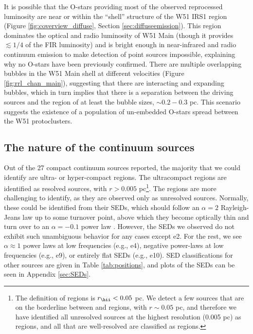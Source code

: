 It is possible that the O-stars providing most of the observed reprocessed
luminosity are near or within the ``shell'' structure of the W51 IRS1 region
(Figure \ref{fig:coverview_diffuse}, Section \ref{sec:diffuseemission}).  This
region dominates the optical and radio luminosity of W51 Main (though it
provides $\lesssim 1/4$ of the FIR luminosity) and is bright enough in
near-infrared and radio continuum emission to make detection of point sources
impossible, explaining why no O-stars have been previously confirmed.  There
are multiple overlapping \hii bubbles in the W51 Main shell at different
velocities (Figure \ref{fig:rrl_chan_main}), suggesting that there are
interacting and  expanding bubbles, which in turn implies that there is a
separation between the driving sources and the \hii region of at least the
bubble sizes, $\sim0.2-0.3$ pc.  This scenario suggests the existence of a
population of un-embedded O-stars spread between the W51 protoclusters.

\subsection{The nature of the continuum sources}
\label{sec:contnature}

Out of the 27 compact continuum sources reported, the majority that we could
identify are ultra- or hyper-compact \hii regions.  The ultracompact \hii
regions are identified as resolved sources, with $r>0.005$
pc\footnote{The
\citet{Kurtz2002a} definition of \hchii regions is $r_{\hii}<0.05$ pc.  We
detect a few sources that are on the borderline between \hchii
and \uchii regions, with $r\sim0.05$ pc, and therefore we have identified all
unresolved sources at the highest resolution (0.005 pc) as \hchii regions, and
all that are well-resolved are classified as \uchii regions.}.  The \hchii
regions are more
challenging to identify, as they are observed only as unresolved sources.
Normally, these could be identified from their SEDs, which should follow an
$\alpha=2$ Rayleigh-Jeans law up to some turnover point, above which they 
become optically thin and turn over to an $\alpha={-0.1}$ power law
\citep{Wilson2009a}.  However, the SEDs we observed do not exhibit such unambiguous
behavior for any cases except e2.  For the rest, we see $\alpha\approx1$ power laws
at low frequencies (e.g., e4), negative power-laws at low frequencies (e.g.,
e9), or entirely flat SEDs (e.g., e10).  SED classifications for other sources
are given in Table \ref{tab:positions}, and plots of the SEDs can be seen in
Appendix \ref{sec:SEDs}.

